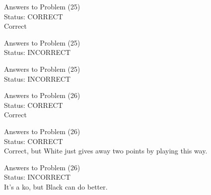 \documentclass[11pt]{article}
\begin{document}
\begin{minipage}[t]{0.5\textwidth}
  {\centering
  
  Answers to Problem (25)\\
  Status: CORRECT\\
  Correct\\
  }
\end{minipage}
\begin{minipage}[t]{0.5\textwidth}
  {\centering
  
  Answers to Problem (25)\\
  Status: INCORRECT\\
  
  }
\end{minipage}
\begin{minipage}[t]{0.5\textwidth}
  {\centering
  
  Answers to Problem (25)\\
  Status: INCORRECT\\
  
  }
\end{minipage}
\begin{minipage}[t]{0.5\textwidth}
  {\centering
  
  Answers to Problem (26)\\
  Status: CORRECT\\
  Correct\\
  }
\end{minipage}
\begin{minipage}[t]{0.5\textwidth}
  {\centering
  
  Answers to Problem (26)\\
  Status: CORRECT\\
  Correct, but White just gives away two points by playing this way.\\
  }
\end{minipage}
\begin{minipage}[t]{0.5\textwidth}
  {\centering
  
  Answers to Problem (26)\\
  Status: INCORRECT\\
  It's a ko, but Black can do better.\\
  }
\end{minipage}
\end{document}
